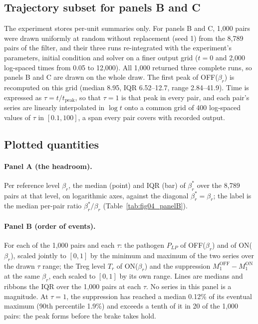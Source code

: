 \documentclass[11pt]{article}
\begin{document}
\subsection{Trajectory subset for panels B and C}

The experiment stores per-unit summaries only. For panels B and C, 1{,}000 pairs were drawn
uniformly at random without replacement (seed 1) from the 8{,}789 pairs of the filter, and their
three runs
re-integrated with the experiment's parameters, initial condition and solver on a finer output
grid ($t = 0$ and 2{,}000 log-spaced times from 0.05 to 12{,}000). All 1{,}000 returned three
complete runs, so panels B and C are drawn on the whole draw.
The first peak of OFF($\beta_r$) is recomputed on this grid (median 8.95, IQR
6.52--12.7, range 2.84--41.9). Time is expressed as $\tau = t/t_{\mathrm{peak}}$, so that
$\tau = 1$ is that peak in every pair, and each pair's series are linearly interpolated in
$\log t$ onto a common grid of 400 log-spaced values of $\tau$ in $[0.1, 100]$, a span every
pair covers with recorded output.

\subsection{Plotted quantities}

\paragraph{Panel A (the headroom).} Per reference level $\beta_r$, the median (point) and IQR
(bar) of $\beta_r^{*}$ over the 8{,}789 pairs at that level, on logarithmic axes, against the
diagonal $\beta_r^{*} = \beta_r$; the label is the median per-pair ratio $\beta_r^{*}/\beta_r$
(Table~\ref{tab:fig04_panelB}).

\paragraph{Panel B (order of events).} For each of the 1{,}000 pairs and each $\tau$: the pathogen
$P_{LP}$ of OFF($\beta_r$) and of ON($\beta_r$), scaled jointly to $[0,1]$ by the minimum and
maximum of the two series over the drawn $\tau$ range; the Treg level $T_r$ of ON($\beta_r$)
and the suppression $M_1^{\mathrm{OFF}} - M_1^{\mathrm{ON}}$ at the same $\beta_r$, each scaled to
$[0,1]$ by its own range. Lines are medians and ribbons the IQR over the 1{,}000 pairs at each
$\tau$. No series in this panel is a magnitude. At $\tau = 1$, the suppression has reached a
median 0.12\% of its eventual maximum (90th percentile 1.9\%) and exceeds a tenth of it in 20 of
the 1{,}000 pairs: the peak forms before the brake takes hold.
\end{document}
